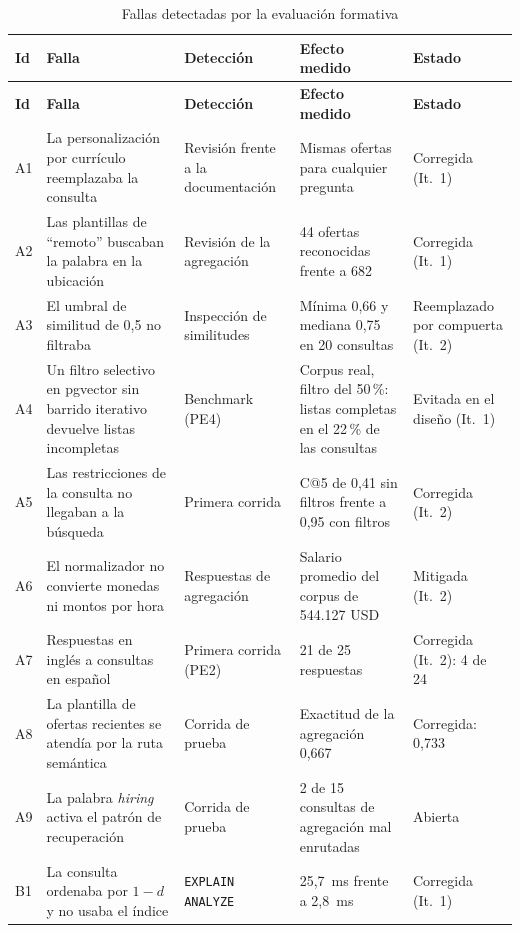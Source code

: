{\small
\begin{longtable}{|p{0.6cm}|p{4.4cm}|p{2.8cm}|p{3.6cm}|p{2.6cm}|}
    \caption{Fallas detectadas por la evaluación formativa}
    \label{tab:art-fallas} \\
    \hline
    \textbf{Id} & \textbf{Falla} & \textbf{Detección} & \textbf{Efecto medido} & \textbf{Estado} \\
    \hline
    \endfirsthead
    \hline
    \textbf{Id} & \textbf{Falla} & \textbf{Detección} & \textbf{Efecto medido} & \textbf{Estado} \\
    \hline
    \endhead
    A1 & La personalización por currículo reemplazaba la consulta & Revisión frente a la documentación & Mismas ofertas para cualquier pregunta & Corregida (It.~1) \\
    \hline
    A2 & Las plantillas de \enquote{remoto} buscaban la palabra en la ubicación & Revisión de la agregación & 44 ofertas reconocidas frente a 682 & Corregida (It.~1) \\
    \hline
    A3 & El umbral de similitud de 0,5 no filtraba & Inspección de similitudes & Mínima 0,66 y mediana 0,75 en 20 consultas & Reemplazado por compuerta (It.~2) \\
    \hline
    A4 & Un filtro selectivo en pgvector sin barrido iterativo devuelve listas incompletas & Benchmark (PE4) & Corpus real, filtro del 50\,\%: listas completas en el 22\,\% de las consultas & Evitada en el diseño (It.~1) \\
    \hline
    A5 & Las restricciones de la consulta no llegaban a la búsqueda & Primera corrida & C@5 de 0,41 sin filtros frente a 0,95 con filtros & Corregida (It.~2) \\
    \hline
    A6 & El normalizador no convierte monedas ni montos por hora & Respuestas de agregación & Salario promedio del corpus de 544.127 USD & Mitigada (It.~2) \\
    \hline
    A7 & Respuestas en inglés a consultas en español & Primera corrida (PE2) & 21 de 25 respuestas & Corregida (It.~2): 4 de 24 \\
    \hline
    A8 & La plantilla de ofertas recientes se atendía por la ruta semántica & Corrida de prueba & Exactitud de la agregación 0,667 & Corregida: 0,733 \\
    \hline
    A9 & La palabra \textit{hiring} activa el patrón de recuperación & Corrida de prueba & 2 de 15 consultas de agregación mal enrutadas & Abierta \\
    \hline
    B1 & La consulta ordenaba por $1-d$ y no usaba el índice & \texttt{EXPLAIN ANALYZE} & 25,7~ms frente a 2,8~ms & Corregida (It.~1) \\

\end{longtable}}

